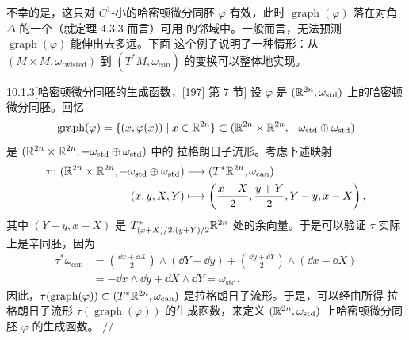不幸的是，这只对 $C^1$-小的哈密顿微分同胚 $\varphi$ 有效，此时
$\operatorname{graph}(\varphi)$ 落在对角 $\Delta$ 的一个（就定理 4.3.3 而言）可用
的邻域中。一般而言，无法预测 $\operatorname{graph}(\varphi)$ 能伸出去多远。下面
这个例子说明了一种情形：从 $(M\times M,\omega_{\mathrm{twisted}})$ 到
$(T^*M,\omega_{\mathrm{can}})$ 的变换可以整体地实现。

\begin{wexam}{10.1.3}[哈密顿微分同胚的生成函数，[197] 第 7 节]
  设 $\varphi$ 是 $(\mathbb{R}^{2n},\omega_{\mathrm{std}})$ 上的哈密顿微分同胚。回忆
  \[
    \operatorname{graph}(\varphi)=\{(x,\varphi(x))\mid x\in\mathbb{R}^{2n}\}
    \subset(\mathbb{R}^{2n}\times\mathbb{R}^{2n},-\omega_{\mathrm{std}}\oplus\omega_{\mathrm{std}})
  \]
  是 $(\mathbb{R}^{2n}\times\mathbb{R}^{2n},-\omega_{\mathrm{std}}\oplus\omega_{\mathrm{std}})$ 中的
  拉格朗日子流形。考虑下述映射
  \begin{align*}
    \tau\colon(\mathbb{R}^{2n}\times\mathbb{R}^{2n},-\omega_{\mathrm{std}}\oplus\omega_{\mathrm{std}})
    &\longrightarrow(T^*\mathbb{R}^{2n},\omega_{\mathrm{can}})\\
    (x,y,X,Y)&\longmapsto
    \left(\frac{x+X}{2},\frac{y+Y}{2},Y-y,x-X\right),
  \end{align*}
  其中 $(Y-y,x-X)$ 是 $T^*_{(x+X)/2,(y+Y)/2}\mathbb{R}^{2n}$ 处的余向量。于是可以验证
  $\tau$ 实际上是辛同胚，因为
  \begin{align*}
    \tau^*\omega_{\mathrm{can}}
    &=\left(\frac{\dd x+\dd X}{2}\right)\wedge(\dd Y-\dd y)
    +\left(\frac{\dd y+\dd Y}{2}\right)\wedge(\dd x-\dd X)\\
    &=-\dd x\wedge\dd y+\dd X\wedge\dd Y=\omega_{\mathrm{std}}.
  \end{align*}
  因此，$\tau(\operatorname{graph}(\varphi))
  \subset(T^*\mathbb{R}^{2n},\omega_{\mathrm{can}})$ 是拉格朗日子流形。于是，可以经由所得
  拉格朗日子流形 $\tau(\operatorname{graph}(\varphi))$ 的生成函数，来定义
  $(\mathbb{R}^{2n},\omega_{\mathrm{std}})$ 上哈密顿微分同胚 $\varphi$ 的生成函数。
  \hfill$//$
\end{wexam}



